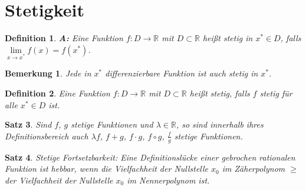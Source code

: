 \documentclass[12pt,a4paper]{report}%
\newtheorem{satz}{Satz}[section]
\newtheorem{definition}[satz]{Definition}
\newtheorem{bem}{Bemerkung}[section]
\numberwithin{equation}{section}
\newcommand{\R}{\mathbb{R}} %
\numberwithin{equation}{subsection}
\begin{document}
\section{Stetigkeit}
  \begin{definition}
    \textbf{A:} \newline Eine Funktion $f:D\rightarrow \R$ mit $D \subset \R$ heißt stetig in $x^* \in D$, falls $\lim\limits_{x \rightarrow x^*} f(x) = f(x^*)$. \label{def:stet_a}
  \end{definition}
  \begin{bem}
    Jede in $x^*$ differenzierbare Funktion ist auch stetig in $x^*$.
  \end{bem}
  \begin{definition}
    Eine Funktion $f:D\rightarrow \R$ mit $D \subset \R$ heißt stetig, falls $f$ stetig für alle $x^* \in D$ ist.
  \end{definition}
  \begin{satz}
    Sind $f$, $g$ stetige Funktionen und $\lambda \in \R$, so sind innerhalb ihres Definitionsbereich auch $\lambda f$, $f+g$, $f\cdot g$, $f\circ g$, $\frac{f}{g}$ stetige Funktionen.
  \end{satz}
  \begin{satz}
  Stetige Fortsetzbarkeit: Eine Definitionslücke einer gebrochen rationalen Funktion ist hebbar, wenn die Vielfachheit der Nullstelle $x_0$ im Zäherpolynom $\geq$ der Vielfachheit der Nullstelle $x_0$ im Nennerpolynom ist.
  \end{satz}
\end{document}
